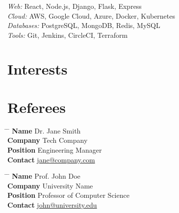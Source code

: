 \documentclass[10pt]{article} %
\begin{document}
{
\textit{Web:} React, Node.js, Django, Flask, Express\\
\textit{Cloud:} AWS, Google Cloud, Azure, Docker, Kubernetes\\
\textit{Databases:} PostgreSQL, MongoDB, Redis, MySQL\\
\textit{Tools:} Git, Jenkins, CircleCI, Terraform
}


\section{Interests}



\section{Referees}

\parbox{0.5\textwidth}{ %
\begin{tabbing}
\hspace{2.75cm} \= \hspace{4cm} \= \kill %
{\bf Name} \> Dr. Jane Smith\\ %
{\bf Company} \> Tech Company \\ %
{\bf Position} \> Engineering Manager \\ %
{\bf Contact} \> \href{mailto:jane@company.com}{jane@company.com} %
\end{tabbing}}
\hfill %
\parbox{0.5\textwidth}{ %
\begin{tabbing}
\hspace{2.75cm} \= \hspace{4cm} \= \kill %
{\bf Name} \> Prof. John Doe\\ %
{\bf Company} \> University Name \\ %
{\bf Position} \> Professor of Computer Science \\ %
{\bf Contact} \> \href{mailto:john@university.edu}{john@university.edu} %
\end{tabbing}}

\end{document}
